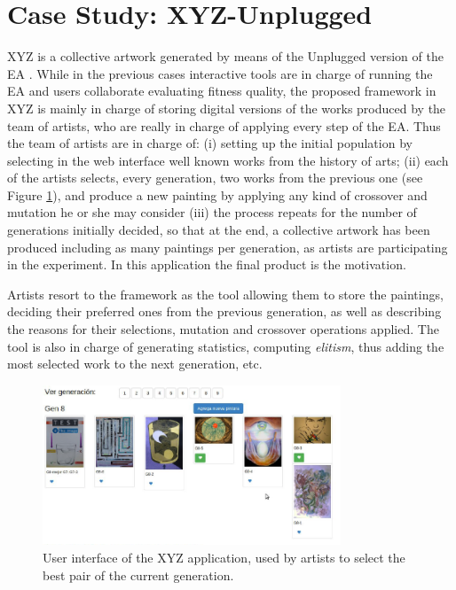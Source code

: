 \section{Case Study: XYZ-Unplugged}
\label{sec:xyz}

XYZ is a collective artwork generated by means of the Unplugged version of the EA \cite{de2014artists}.
While in the previous cases interactive tools are in charge of running the EA and users collaborate evaluating
fitness quality, the proposed framework in XYZ is mainly in charge of storing digital versions of the works produced 
by the team of artists, who are really in charge of applying every step of the EA. Thus the team of artists 
are in charge of:  (i) setting up the initial population by selecting in the web interface
well known works from the history of arts;  (ii) each of the artists selects, every generation, two works 
from the previous one (see Figure \ref{fig:xyz}), and produce a new painting by applying 
any kind of crossover and mutation he or she may consider  (iii) the process repeats for the number 
of generations initially decided, so that at the end, a collective  artwork has been produced 
including as many paintings per generation, as artists are participating in the experiment. In this application
the final product is the motivation.  

Artists resort to the framework as the tool allowing them 
to store the paintings, deciding their preferred ones from the
previous generation, as well as describing the reasons for their 
selections, mutation and crossover operations applied.
The tool is also in charge of generating statistics, 
computing \textit{elitism}, thus adding the most selected work to 
the next generation, etc. 

\begin{figure}[!t]
    \centering
        \includegraphics[width=3.5in]{img/interfaceXYZ.png}
    \caption{User interface of the XYZ application, used by artists to select the best pair of the current generation.}
    \label{fig:xyz}
\end{figure}

